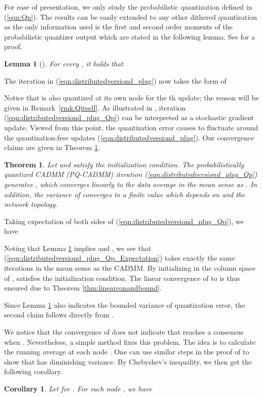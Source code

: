 \documentclass[journal]{IEEEtran}
\newtheorem{theorem}{Theorem}
\newtheorem{corollary}{Corollary}
\newtheorem{lemma}{Lemma}
\begin{document}
For ease of presentation, we only study the probabilistic quantization defined in (\ref{eqn:Qp}). The results can be easily extended to any other dithered quantization as the only information used is the first and second order moments of the probabilistic quantizer output which are stated in the following lemma. See \cite{Xiao2005a} for a proof.

\begin{lemma}[{\cite[Lemma 2]{Xiao2005a}}]
\label{lem:QPproperty}
For every , it holds that 

\end{lemma}
The iteration in (\ref{eqn:distributedversiond_plug}) now takes the form of
 
Notice that  is also quantized at its own node for the th update; the reason will be given in Remark~\ref{rmk:Qitself}. As illustrated in \cite{Zhu2009}, iteration (\ref{eqn:distributedversiond_plug_Qp}) can be interpreted as a stochastic gradient update. Viewed from this point, the quantization error causes  to fluctuate around the quantization-free updates  (\ref{eqn:distributedversiond_plug}). Our convergence claims are given in Theorem \ref{thm:Qpresult}.
\begin{theorem}
\label{thm:Qpresult}
Let  and   satisfy the initialization condition. The probabilistically quantized CADMM (PQ-CADMM) iteration (\ref{eqn:distributedversiond_plug_Qp}) generates , which converges linearly to the data average  in the mean sense as . In addition, the variance of  converges to a finite value which depends on  and the network topology.
\end{theorem}
\begin{IEEEproof}
Taking expectation of both sides of  (\ref{eqn:distributedversiond_plug_Qp}), we have 
 
Noting that Lemma \ref{lem:QPproperty} implies  and , we see that (\ref{eqn:distributedversiond_plug_Qp_Expectation}) takes exactly the same iterations in the mean sense as the CADMM. By initializing  in the column space of ,  satisfies the initialization condition. The linear convergence of  to  is thus ensured due to Theorem \ref{thm:linearconandbound}.

Since Lemma \ref{lem:QPproperty} also indicates the bounded variance of quantization error, the second claim follows directly from \cite[Proposition 3]{Zhu2009}.
\end{IEEEproof}

We notice that the convergence of  does not indicate that  reaches a consensus when . Nevertheless, a simple method fixes this problem. The idea is to calculate the running average  at each node . One can use similar steps in the proof of \cite[Proposition 3]{Zhu2009} to show that  has diminishing variance. By Chebyshev's inequality, we then get the following corollary.
\begin{corollary}
Let  for . For each node , we have 
\end{corollary}
 
\end{document}
